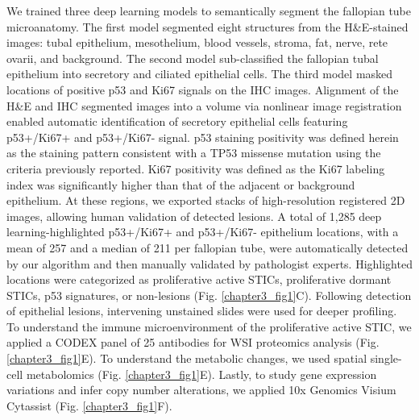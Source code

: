 \begin{refsection}
    We trained three deep learning models to semantically segment the fallopian tube microanatomy. The first model segmented eight structures from the H\&E-stained images: tubal epithelium, mesothelium, blood vessels, stroma, fat, nerve, rete ovarii, and background. The second model sub-classified the fallopian tubal epithelium into secretory and ciliated epithelial cells. The third model masked locations of positive p53 and Ki67 signals on the IHC images. Alignment of the H\&E and IHC segmented images into a volume via nonlinear image registration\cite{Kiemen2022CODA,Forjaz2025PIVOT} enabled automatic identification of secretory epithelial cells featuring p53+/Ki67+ and p53+/Ki67- signal. p53 staining positivity was defined herein as the staining pattern consistent with a TP53 missense mutation using the criteria previously reported\cite{Yemelyanova2011Immunohistochemical}. Ki67 positivity was defined as the Ki67 labeling index was significantly higher than that of the adjacent or background epithelium. At these regions, we exported stacks of high-resolution registered 2D images, allowing human validation of detected lesions. A total of 1,285 deep learning-highlighted p53+/Ki67+ and p53+/Ki67- epithelium locations, with a mean of 257 and a median of 211 per fallopian tube, were automatically detected by our algorithm and then manually validated by pathologist experts. Highlighted locations were categorized as proliferative active STICs, proliferative dormant STICs, p53 signatures, or non-lesions (Fig. \ref{chapter3_fig1}C). 
    Following detection of epithelial lesions, intervening unstained slides were used for deeper profiling. To understand the immune microenvironment of the proliferative active STIC, we applied a CODEX panel of 25 antibodies for WSI proteomics analysis (Fig. \ref{chapter3_fig1}E). To understand the metabolic changes, we used spatial single-cell metabolomics (Fig. \ref{chapter3_fig1}E). Lastly, to study gene expression variations and infer copy number alterations, we applied 10x Genomics Visium Cytassist (Fig. \ref{chapter3_fig1}F).
    

\end{refsection}
